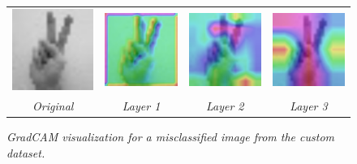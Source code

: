 \documentclass[a4paper]{article}
\begin{document}
\begin{figure}[t]
     \centering
     \begin{tabular}{cccc}
          \includegraphics[width=.2\linewidth]{graphics/gradcam/custom_dataset/v_original}&\includegraphics[width=.2\linewidth]{graphics/gradcam/custom_dataset/v_l1}&\includegraphics[width=.2\linewidth]{graphics/gradcam/custom_dataset/v_l3}&
          \includegraphics[width=.2\linewidth]{graphics/gradcam/custom_dataset/v_l5}\\
          \textit{Original} & \textit{Layer 1} & \textit{Layer 2} & \textit{Layer 3}
     \end{tabular}
     \caption{\textit{GradCAM visualization for a misclassified image from the custom dataset.}}
     \label{fig:gradcam_custom}
\end{figure}
\end{document}
